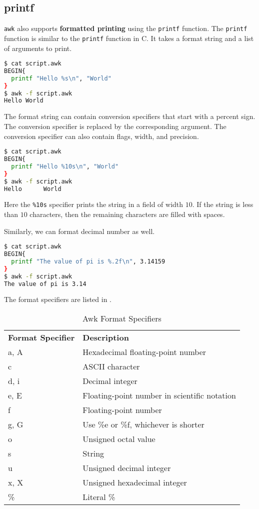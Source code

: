 \subsection{printf}

\lstinline|awk| also supports \textbf{formatted printing} using the \lstinline|printf| function.
The \lstinline|printf| function is similar to the \lstinline|printf| function in C.
It takes a format string and a list of arguments to print.

\begin{lstlisting}[language=bash]
$ cat script.awk
BEGIN{
  printf "Hello %s\n", "World"
}
$ awk -f script.awk
Hello World
\end{lstlisting}

The format string can contain conversion specifiers that start with a percent sign.
The conversion specifier is replaced by the corresponding argument.
The conversion specifier can also contain flags, width, and precision.

\begin{lstlisting}[language=bash]
$ cat script.awk
BEGIN{
  printf "Hello %10s\n", "World"
}
$ awk -f script.awk
Hello      World
\end{lstlisting}

Here the \lstinline|%10s| specifier prints the string in a field of width $10$.
If the string is less than $10$ characters, then the remaining characters are filled with spaces.

Similarly, we can format decimal number as well.

\begin{lstlisting}[language=bash]
$ cat script.awk
BEGIN{
  printf "The value of pi is %.2f\n", 3.14159
}
$ awk -f script.awk
The value of pi is 3.14
\end{lstlisting}

The format specifiers are listed in .
\begin{table*}[h!]
    \centering
    \begin{tabular}{l l}
        \textbf{Format Specifier} & \textbf{Description} \\
        a, A & Hexadecimal floating-point number \\
        c & ASCII character \\
        d, i & Decimal integer \\
        e, E & Floating-point number in scientific notation \\
        f & Floating-point number \\
        g, G & Use \%e or \%f, whichever is shorter \\
        o & Unsigned octal value \\
        s & String \\
        u & Unsigned decimal integer \\
        x, X & Unsigned hexadecimal integer \\
        \% & Literal \% \\
    \end{tabular}
    \caption{Awk Format Specifiers}
\end{table*}

